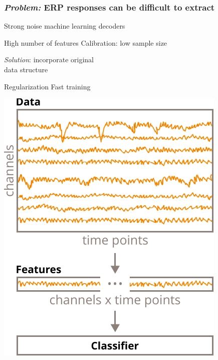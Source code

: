 \documentclass{kul-ulille-beamer}
\begin{document}
\begin{frame}[c]
  \frametitle{\emph{Problem:} ERP responses can be difficult to extract}
  \begin{minipage}[c]{.5\textwidth}

    Strong noise \ergo machine learning decoders
    \begin{itemize}
      \itemnega High number of features
      \itemnega Calibration: low sample size
    \end{itemize}
    \bigskip

    \emph{Solution}: incorporate original \\ data structure
    \begin{itemize}
      \itemposi Regularization
      \itemposi Fast training
    \end{itemize}
  \end{minipage}\hfill%
  \begin{minipage}[c]{.35\textwidth}
    \centering
    \includegraphics[width=\textwidth]{figures/decode/epoch.pdf}
  \end{minipage}
\end{frame}
\end{document}
